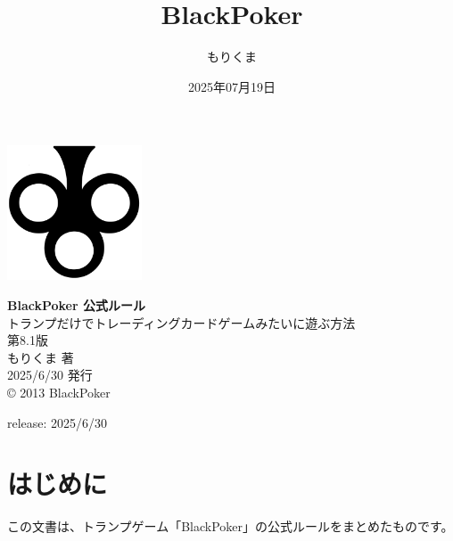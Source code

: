 \documentclass[letterpaper,10pt,dvipdfmx]{sphinxmanual}
\title{BlackPoker}
\date{2025年07月19日}
\author{もりくま}
\begin{document}
\pagestyle{empty}

\begin{titlepage}
\begin{center}
\vspace*{25mm}

\includegraphics[width=4cm]{blackpoker_logo.pdf}  %

\vspace{20mm}
{\Huge \textbf{BlackPoker 公式ルール}}\\[10mm]
{\Large トランプだけでトレーディングカードゲームみたいに遊ぶ方法}\\[30mm]

{\huge 第8.1版}\\[20mm]

{\Large もりくま 著} \\[5mm]
{\Large 2025/6/30 発行}\\[10mm]

{\small © 2013 BlackPoker}

\end{center}
\end{titlepage}

\clearpage
\thispagestyle{empty}  %
\null                  %
\clearpage             %

\pagestyle{plain}
\sphinxtableofcontents
\pagestyle{normal}
\label{\detokenize{index::doc}}


\sphinxAtStartPar
release: 2025/6/30

\sphinxstepscope


\chapter{はじめに}
\label{\detokenize{init/init:init-rst}}\label{\detokenize{init/init:id1}}\label{\detokenize{init/init::doc}}
\sphinxAtStartPar
この文書は、トランプゲーム「BlackPoker」の公式ルールをまとめたものです。
\end{document}
